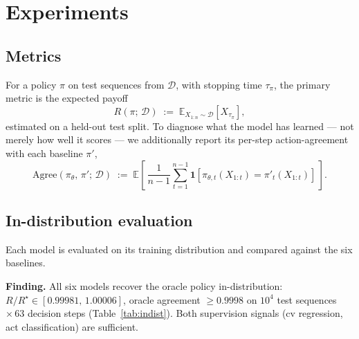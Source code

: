 \documentclass[11pt]{article}
\begin{document}
\section{Experiments}
\label{sec:experiments}

\subsection{Metrics}

For a policy $\pi$ on test sequences from $\mathcal{D}$, with stopping time $\tau_\pi$, the primary metric is the expected payoff
\[
R(\pi;\,\mathcal{D}) \;:=\; \mathbb{E}_{X_{1:n}\sim\mathcal{D}}\!\left[X_{\tau_\pi}\right],
\]
estimated on a held-out test split. To diagnose what the model has learned --- not merely how well it scores --- we additionally report its per-step action-agreement with each baseline $\pi'$,
\[
\mathrm{Agree}(\pi_\theta,\, \pi';\,\mathcal{D}) \;:=\; \mathbb{E}\!\left[\,\frac{1}{n-1}\sum_{t=1}^{n-1}\mathbf{1}\!\left[\pi_{\theta,t}(X_{1:t}) = \pi'_t(X_{1:t})\right]\,\right].
\]

\subsection{In-distribution evaluation}
\label{sec:exp-indist}

Each model is evaluated on its training distribution and compared against the six baselines. 

\textbf{Finding.} All six models recover the oracle policy in-distribution: $R/R^\star \in [0.99981,\, 1.00006]$, oracle agreement $\ge 0.9998$ on $10^4$ test sequences $\times\,63$ decision steps (Table~\ref{tab:indist}). Both supervision signals (cv regression, act classification) are sufficient.
\end{document}

